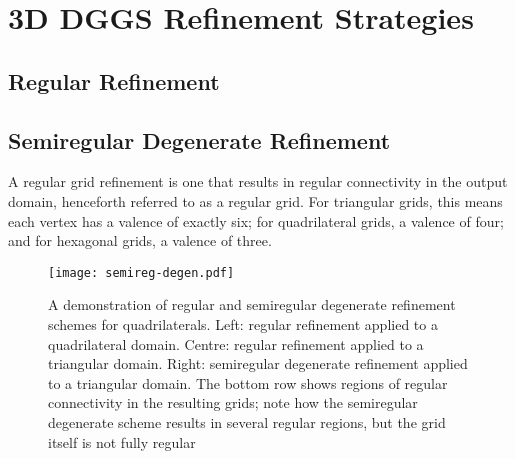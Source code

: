\section{3D DGGS Refinement Strategies} \label{chap:3:refinement}



\subsection{Regular Refinement} \label{chap:3:regular}

\subsection{Semiregular Degenerate Refinement} \label{chap:3:semiregDegen}
A regular grid refinement is one that results in regular connectivity in the output domain, henceforth referred to as a regular grid.
For triangular grids, this means each vertex has a valence of exactly six; for quadrilateral grids, a valence of four; and for hexagonal grids, a valence of three.


\begin{figure}[ht!]
	\centering
	\texttt{[image: semireg-degen.pdf]}
	\caption[Comparison of regular and semiregular degenerate refinement]{
		A demonstration of regular and semiregular degenerate refinement schemes for quadrilaterals.
		Left: regular refinement applied to a quadrilateral domain.
		Centre: regular refinement applied to a triangular domain.
		Right: semiregular degenerate refinement applied to a triangular domain.
		The bottom row shows regions of regular connectivity in the resulting grids; note how the semiregular degenerate scheme results in several regular regions, but the grid itself is not fully regular
	}
	\label{fig:semireg-degen}
\end{figure}



